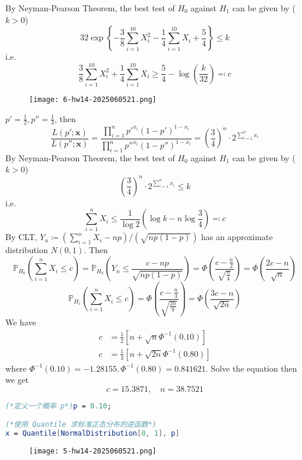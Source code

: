 By Neyman-Pearson Theorem, the best test of $H_0$ against $H_1$ can be given by ($k>0$)
\[
32\exp \left\{ -\frac{3}{8}\sum_{i=1}^{10} X_i^{2}-\frac{1}{4}\sum_{i=1}^{10} X_i+\frac{5}{4} \right\} \leq k
\]
i.e.
\[
\frac{3}{8}\sum_{i=1}^{10} X_i^{2}+\frac{1}{4}\sum_{i=1}^{10} X_i\geq \frac{5}{4}-\log\left( \frac{k}{32} \right)\eqqcolon c
\]
\begin{exercise}
\begin{figure}[H]
\centering
\texttt{[image: 6-hw14-2025060521.png]}
\label{}
\end{figure}
\end{exercise}
$p'=\frac{1}{2},p''=\frac{1}{3}$, then
\[
\frac{L(p';\mathbf{x})}{L(p'';\mathbf{x})}=\frac{\prod_{i=1}^{n} p'^{x_i}(1-p')^{1-x_i}}{\prod_{i=1}^{n} p''^{x_i}(1-p'')^{1-x_i}}=\left( \frac{3}{4} \right)^{n}\cdot2^{\sum_{i=1}^{n} x_i}
\]
By Neyman-Pearson Theorem, the best test of $H_0$ against $H_1$ can be given by ($k>0$)
\[
\left( \frac{3}{4} \right)^{n}\cdot2^{\sum_{i=1}^{n} x_i}\leq k
\]
i.e.
\[
\sum_{i=1}^{n} X_i\leq \frac{1}{\log2}\left( \log k-n\log\frac{3}{4} \right)\eqqcolon c
\]
By CLT, $Y_n\coloneqq\left( \sum_{i=1}^{n}X_i-np \right)/(\sqrt{ n p(1-p)})$ has an approximate distribution $N(0,1)$. Then
\[
\mathbb{P}_{H_0}\left( \sum_{i=1}^{n} X_i\leq c \right)=\mathbb{P}_{H_0}\left( Y_n\leq \frac{c-np}{\sqrt{ np(1-p) }} \right)=\Phi\left( \frac{c-\frac{n}{2}}{\sqrt{ \frac{n}{4} }} \right)=\Phi \left( \frac{2c-n}{\sqrt{ n }} \right)
\]
\[
\mathbb{P}_{H_1}\left( \sum_{i=1}^{n} X_i\leq c \right)=\Phi\left( \frac{c-\frac{n}{3}}{\sqrt{ \frac{2n}{9} }} \right)=\Phi\left( \frac{3c-n}{\sqrt{ 2n }} \right)
\]
We have
\[
\begin{aligned}
c & =\frac{1}{2}[n+\sqrt{ n }\Phi ^{-1}(0.10)] \\
c & =\frac{1}{3}[n+\sqrt{ 2n }\Phi ^{-1}(0.80)]
\end{aligned}
\]
where $\Phi ^{-1}(0.10)=-1.28155, \Phi ^{-1}(0.80)=0.841621$. Solve the equation then we get
\[
c=15.3871,\quad n=38.7521
\]
\begin{lstlisting}[language=mathematica]
(*定义一个概率 p*)p = 0.10;

(*使用 Quantile 求标准正态分布的逆函数*)
x = Quantile[NormalDistribution[0, 1], p]
\end{lstlisting}
\begin{exercise}
\begin{figure}[H]
\centering
\texttt{[image: 5-hw14-2025060521.png]}
\label{}
\end{figure}
\end{exercise}
